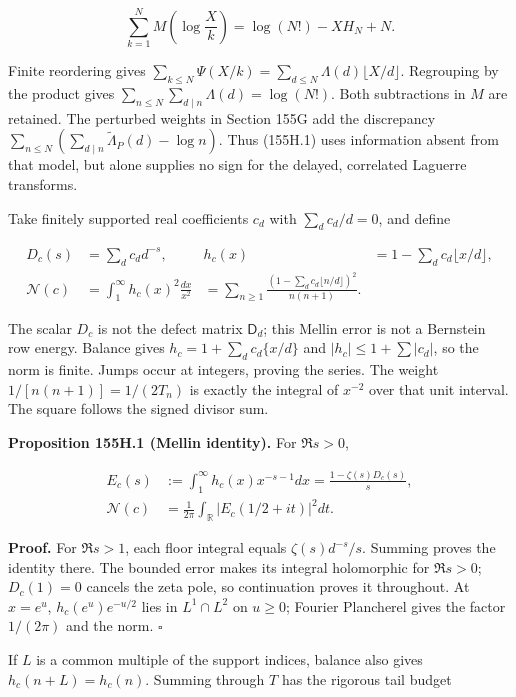 \documentclass[
  11pt,
]{book}
\begin{document}
\[
\boxed{\sum_{k=1}^N M\!\left(\log\frac Xk\right)
 =\log(N!)-XH_N+N.}
\tag{155H.1}
\]

Finite reordering gives
\(\sum_{k\le N}\Psi(X/k)=\sum_{d\le N}\Lambda(d)\lfloor X/d\rfloor\).
Regrouping by the product gives
\(\sum_{n\le N}\sum_{d\mid n}\Lambda(d)=\log(N!)\). Both subtractions in
\(M\) are retained. The perturbed weights in Section 155G add the
discrepancy
\(\sum_{n\le N}(\sum_{d\mid n}\widetilde\Lambda_P(d)-\log n)\). Thus
(155H.1) uses information absent from that model, but alone supplies no
sign for the delayed, correlated Laguerre transforms.

Take finitely supported real coefficients \(c_d\) with
\(\sum_dc_d/d=0\), and define

\[
\begin{aligned}
D_c(s)&=\sum_dc_dd^{-s},&
 h_c(x)&=1-\sum_dc_d\lfloor x/d\rfloor,\\
\mathscr N(c)&=\int_1^\infty h_c(x)^2\frac{dx}{x^2}
 &=\sum_{n\ge1}\frac{(1-\sum_dc_d\lfloor n/d\rfloor)^2}{n(n+1)}.
\end{aligned}
\tag{155H.2}
\]

The scalar \(D_c\) is not the defect matrix \(\mathsf D_d\); this Mellin
error is not a Bernstein row energy. Balance gives
\(h_c=1+\sum_dc_d\{x/d\}\) and \(|h_c|\le1+\sum|c_d|\), so the norm is
finite. Jumps occur at integers, proving the series. The weight
\(1/[n(n+1)]=1/(2T_n)\) is exactly the integral of \(x^{-2}\) over that
unit interval. The square follows the signed divisor sum.

\textbf{Proposition 155H.1 (Mellin identity).} For \(\Re s>0\),

\[
\begin{aligned}
E_c(s)&:=\int_1^\infty h_c(x)x^{-s-1}dx
 =\frac{1-\zeta(s)D_c(s)}s,\\
\mathscr N(c)&=\frac1{2\pi}\int_{\mathbb R}
 |E_c(1/2+it)|^2dt.
\end{aligned}
\tag{155H.3}
\]

\textbf{Proof.} For \(\Re s>1\), each floor integral equals
\(\zeta(s)d^{-s}/s\). Summing proves the identity there. The bounded
error makes its integral holomorphic for \(\Re s>0\); \(D_c(1)=0\)
cancels the zeta pole, so continuation proves it throughout. At
\(x=e^u\), \(h_c(e^u)e^{-u/2}\) lies in \(L^1\cap L^2\) on \(u\ge0\);
Fourier Plancherel gives the factor \(1/(2\pi)\) and the norm.
\(\square\)

If \(L\) is a common multiple of the support indices, balance also gives
\(h_c(n+L)=h_c(n)\). Summing through \(T\) has the rigorous tail budget
\end{document}
